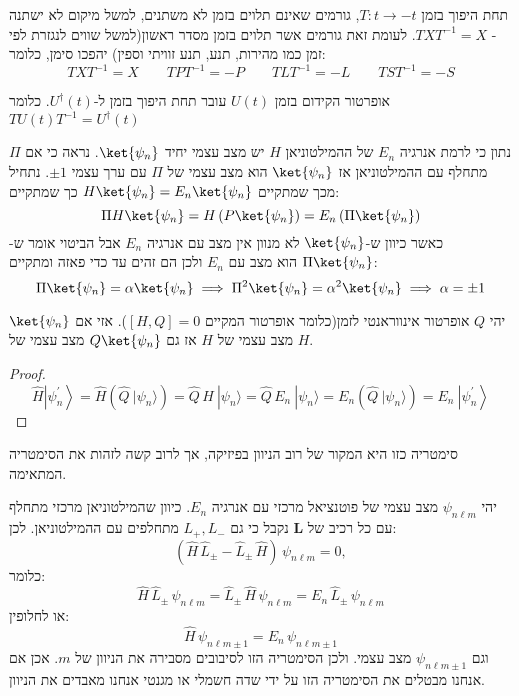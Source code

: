 \documentclass{tstextbook}
\begin{document}
\begin{proposition}
תחת היפוך בזמן \(T:t\to -t\), גורמים שאינם תלוים בזמן לא משתנים, למשל מיקום לא ישתנה - \(TXT^{-1}=X\). לעומת זאת גורמים אשר תלוים בזמן מסדר ראשון(למשל שווים לנגזרת לפי זמן כמו מהירות, תנע, תנע זוויתי וספין) יהפכו סימן, כלומר:
$$TXT^{-1}=X \qquad TPT^{-1}=-P \qquad TLT^{-1} = -L \qquad TST^{-1}=-S$$

\end{proposition}
\begin{proposition}
אופרטור הקידום בזמן \(U(t)\) עובר תחת היפוך בזמן ל-\(U^{\dagger}(t)\). כלומר \(T U(t)T^{-1}=U^{\dagger}(t)\)

\end{proposition}
\begin{example}
נתון כי לרמת אנרגיה \(E_{n}\) של ההמילטוניאן \(H\) יש מצב עצמי יחיד \(\ket{\psi_{n}}\). נראה כי אם \(\Pi\) מתחלף עם ההמילטוניאן אז \(\ket{\psi_{n}}\) הוא מצב עצמי של \(\Pi\) עם ערך עצמי \(\pm 1\).
נתחיל מכך שמתקיים \(H\ket{\psi_{n}}=E_{n}\ket{\psi_{n}}\) כך שמתקיים:
$$\Pi H\ket{\psi_{n}} =H\left( P\ket{\psi_{n}}  \right)=E_{n}\left( \Pi\ket{\psi_{n}}  \right)$$
כאשר כיוון ש-\(\ket{\psi_{n}}\) לא מנוון אין מצב עם אנרגיה \(E_{n}\) אבל הביטוי אומר ש-\(\Pi \ket{\psi_{n}}\) הוא מצב עם \(E_{n}\) ולכן הם זהים עד כדי פאזה ומתקיים:
$$\Pi \ket{\psi_{n}} =\alpha \ket{\psi_{n}} \implies \Pi^{2}\ket{\psi_{n}}=\alpha^{2}\ket{\psi_{n}}\implies \alpha=\pm 1$$

\end{example}
\begin{proposition}
יהי \(Q\) אופרטור אינווראנטי לזמן(כלומר אופרטור המקיים \([H,Q]=0\)). אזי אם \(\ket{\psi_{n}}\) מצב עצמי של \(H\) אז גם \(Q\ket{\psi_{n}}\) מצב עצמי של \(H\).

\end{proposition}
\begin{proof}
$${\hat{H}} \left|\psi_{n}^{\prime}\right\rangle={\hat{H}}\left({\hat{Q}}\ |\psi_{n}\rangle\right)={\hat{Q}}\,{\hat{H}}\ |\psi_{n}\rangle={\hat{Q}}\,E_{n}\ |\psi_{n}\rangle=E_{n}\left({\hat{Q}}\ |\psi_{n}\rangle\right)=E_{n}\ \left|\psi_{n}^{\prime}\right\rangle$$

\end{proof}
\begin{remark}
סימטריה כזו היא המקור של רוב הניוון בפיזיקה, אך לרוב קשה לזהות את הסימטריה המתאימה.

\end{remark}
\begin{example}
יהי \(\psi_{n\ell m}\) מצב עצמי של פוטנציאל מרכזי עם אנרגיה \(E_{n}\). כיוון שהמילטוניאן מרכזי מתחלף עם כל רכיב של \(\mathbf{L}\) נקבל כי גם \(L_{+},L_{-}\) מתחלפים עם ההמילטוניאן. לכן:
$$\left(\hat{H}\,\hat{L}_{\pm}-\hat{L}_{\pm}\,\hat{H}\right)\,\psi_{n\ell m}=0,$$
כלומר:
$$\hat{H}\,\hat{L}_{\pm}\,\psi_{n\ell m}=\hat{L}_{\pm}\,\hat{H}\,\psi_{n\ell m}=E_{n}\,\hat{L}_{\pm}\,\psi_{n\ell m}$$
או לחלופין:
$$\hat{H}\,\psi_{n\ell m\pm1}=E_{n}\,\psi_{n\ell m\pm1}$$
וגם \(\psi_{n\ell m\pm 1}\) מצב עצמי. ולכן הסימטריה הזו לסיבובים מסבירה את הניוון של \(m\). אכן אם אנחנו מבטלים את הסימטריה הזו על ידי שדה חשמלי או מגנטי אנחנו מאבדים את הניוון.

\end{example}
\end{document}
